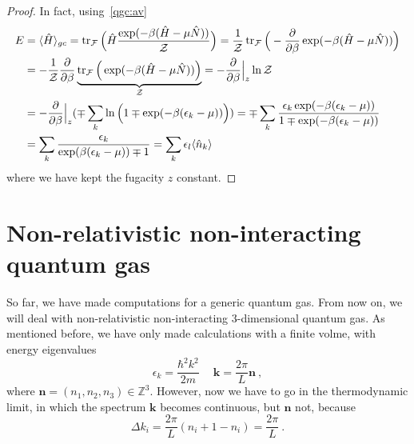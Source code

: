     \begin{proof}
        In fact, using~\eqref{qgc:av}
        \begin{equation*}
        \begin{aligned}
            E & = \langle\hat H\rangle_{gc} = \operatorname{tr}_{\mathcal F} \Big (\hat H \frac{\exp (-\beta (\hat H - \mu \hat N))}{\mathcal Z} \Big) = \frac{1}{\mathcal Z} \operatorname{tr}_{\mathcal F} \Big (- \frac{\partial}{\partial\beta} \exp (-\beta (\hat H - \mu \hat N)) \Big) \\ &  = - \frac{1}{\mathcal Z} \frac{\partial}{\partial\beta}\underbrace{ \operatorname{tr}_{\mathcal F} \Big (\exp (-\beta (\hat H - \mu \hat N)) \Big)}_{\mathcal Z} = - \frac{\partial}{\partial\beta} \Big \vert_z \ln \mathcal Z \\ & =  - \frac{\partial}{\partial\beta} \Big \vert_z (\mp \sum_k \ln \Big (1 \mp \exp (-\beta (\epsilon_k - \mu)) \Big))  = \mp \sum_k \frac{\epsilon_k \exp (-\beta (\epsilon_k - \mu))}{1 \mp \exp (-\beta (\epsilon_k - \mu))}  \\ & = \sum_k \frac{\epsilon_k}{\exp (\beta (\epsilon_k - \mu)) \mp 1} = \sum_k \epsilon_l \langle\hat n_k\rangle
        \end{aligned}
        \end{equation*}
        where we have kept the fugacity $z$ constant.
    \end{proof}

\section{Non-relativistic non-interacting quantum gas}

    So far, we have made computations for a generic quantum gas. From now on, we will deal with non-relativistic non-interacting $3$-dimensional quantum gas. As mentioned before, we have only made calculations with a finite volme, with energy eigenvalues 
    \begin{equation*}
        \epsilon_k = \frac{\hbar^2 k^2}{2m} ~ \quad \mathbf k = \frac{2\pi}{L} \mathbf n ~,
    \end{equation*}
    where $\mathbf n = (n_1, n_2, n_3) \in \mathbb Z^3$. However, now we have to go in the thermodynamic limit, in which the spectrum $\mathbf k$ becomes continuous, but $\mathbf n$ not, because
    \begin{equation*}
        \Delta k_i = \frac{2\pi}{L} (n_i + 1 - n_i) = \frac{2\pi}{L} ~.
    \end{equation*}


